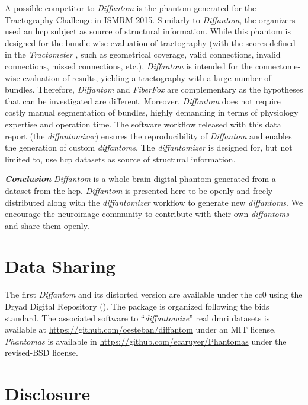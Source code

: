 \documentclass[english]{frontiers/frontiersSCNS} %
\begin{document}
A possible competitor to \emph{Diffantom} is the phantom generated for the Tractography Challenge in
  ISMRM 2015.
Similarly to \emph{Diffantom}, the organizers used an \gls*{hcp} subject as source of structural information.
While this phantom is designed for the bundle-wise evaluation of tractography (with the scores defined in the
  \emph{Tractometer} \citep{cote_tractometer_2013}, such as geometrical coverage, valid connections, invalid connections,
  missed connections, etc.), \emph{Diffantom} is intended for the connectome-wise evaluation of results,
  yielding a tractography with a large number of bundles.
Therefore, \emph{Diffantom} and \emph{FiberFox} are complementary as the hypotheses that can be investigated are different.
Moreover, \emph{Diffantom} does not require costly manual segmentation of bundles, highly demanding in terms of physiology
  expertise and operation time.
The software workflow released with this data report (the \emph{diffantomizer}) ensures the reproducibility of
  \emph{Diffantom} and enables the generation of custom \emph{diffantoms}.
The \emph{diffantomizer} is designed for, but not limited to, use \gls*{hcp} datasets as source of structural information.

\noindent\textbf{\textit{Conclusion\textcolon}}\label{sec:conclusion} %
\emph{Diffantom} is a whole-brain digital phantom generated from a dataset from the \acrlong*{hcp}.
\emph{Diffantom} is presented here to be openly and freely distributed along with the \emph{diffantomizer} workflow
  to generate new \emph{diffantoms}.
We encourage the neuroimage community to contribute with their own \emph{diffantoms} and share them openly.


\section*{Data Sharing}
The first \emph{Diffantom} and its distorted version are available under the \gls*{cc0} using the Dryad Digital Repository
  ().
The package is organized following the \gls*{bids} standard.
The associated software to ``\emph{diffantomize}'' real \gls*{dmri} datasets is available at
  \url{https://github.com/oesteban/diffantom} under an MIT license.
\emph{Phantomas} is available in \url{https://github.com/ecaruyer/Phantomas} under the revised-BSD license.

\section*{Disclosure}
\end{document}
